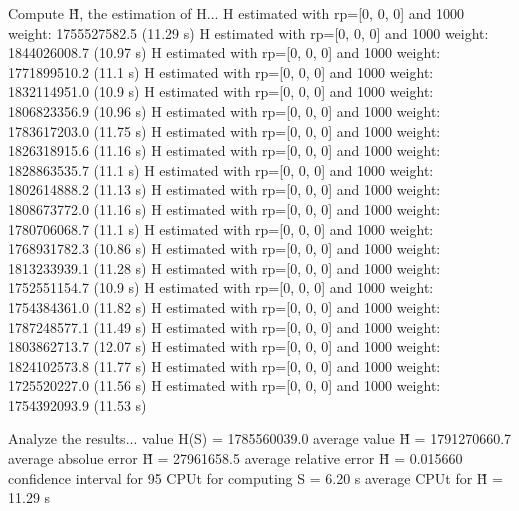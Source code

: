 Compute H̃, the estimation of H...
  H estimated with rp=[0, 0, 0] and 1000 weight:  1755527582.5  (11.29 s)
  H estimated with rp=[0, 0, 0] and 1000 weight:  1844026008.7  (10.97 s)
  H estimated with rp=[0, 0, 0] and 1000 weight:  1771899510.2  (11.1 s)
  H estimated with rp=[0, 0, 0] and 1000 weight:  1832114951.0  (10.9 s)
  H estimated with rp=[0, 0, 0] and 1000 weight:  1806823356.9  (10.96 s)
  H estimated with rp=[0, 0, 0] and 1000 weight:  1783617203.0  (11.75 s)
  H estimated with rp=[0, 0, 0] and 1000 weight:  1826318915.6  (11.16 s)
  H estimated with rp=[0, 0, 0] and 1000 weight:  1828863535.7  (11.1 s)
  H estimated with rp=[0, 0, 0] and 1000 weight:  1802614888.2  (11.13 s)
  H estimated with rp=[0, 0, 0] and 1000 weight:  1808673772.0  (11.16 s)
  H estimated with rp=[0, 0, 0] and 1000 weight:  1780706068.7  (11.1 s)
  H estimated with rp=[0, 0, 0] and 1000 weight:  1768931782.3  (10.86 s)
  H estimated with rp=[0, 0, 0] and 1000 weight:  1813233939.1  (11.28 s)
  H estimated with rp=[0, 0, 0] and 1000 weight:  1752551154.7  (10.9 s)
  H estimated with rp=[0, 0, 0] and 1000 weight:  1754384361.0  (11.82 s)
  H estimated with rp=[0, 0, 0] and 1000 weight:  1787248577.1  (11.49 s)
  H estimated with rp=[0, 0, 0] and 1000 weight:  1803862713.7  (12.07 s)
  H estimated with rp=[0, 0, 0] and 1000 weight:  1824102573.8  (11.77 s)
  H estimated with rp=[0, 0, 0] and 1000 weight:  1725520227.0  (11.56 s)
  H estimated with rp=[0, 0, 0] and 1000 weight:  1754392093.9  (11.53 s)

Analyze the results...
  value H(S)                  = 1785560039.0 
  average value H̃             = 1791270660.7 
  average absolue error H̃     = 27961658.5 
  average relative error H̃    = 0.015660 
  confidence interval for 95%
  CPUt for computing S         = 6.20 s
  average CPUt for H̃           = 11.29 s

